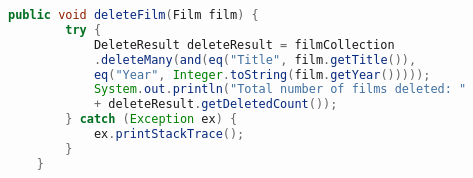 \begin{lstlisting}[language=Java,  basicstyle=\footnotesize]
	public void deleteFilm(Film film) {
		try {
			DeleteResult deleteResult = filmCollection
			.deleteMany(and(eq("Title", film.getTitle()),
			eq("Year", Integer.toString(film.getYear()))));
			System.out.println("Total number of films deleted: "
			+ deleteResult.getDeletedCount());
		} catch (Exception ex) {
			ex.printStackTrace();
		}
	}
\end{lstlisting}